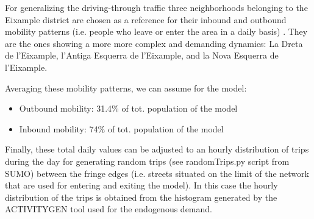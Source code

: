 \documentclass[11pt]{article}
\begin{document}
For generalizing the driving-through traffic three neighborhoods belonging to the Eixample district are chosen as a reference for their inbound and outbound mobility patterns (i.e. people who leave or enter the area in a daily basis) \citep{BestiarioProyectosS.L.2014}. They are the ones showing a more more complex and demanding dynamics: La Dreta de l'Eixample, l'Antiga Esquerra de l'Eixample, and la Nova Esquerra de l'Eixample.

\begin{table}[htbp]
\centering
\caption{Demographic and mobility data for reference neighborhoods.}
\label{tab:hoods-ref}
\end{table}

Averaging these mobility patterns, we can assume for the model:
\begin{itemize}
    \item Outbound mobility: 31.4\% of tot. population of the model
    \item Inbound mobility: 74\% of tot. population of the model
\end{itemize}

Finally, these total daily values can be adjusted to an hourly distribution of trips during the day for generating random trips (see randomTrips.py script from SUMO) between the fringe edges (i.e. streets situated on the limit of the network that are used for entering and exiting the model). In this case the hourly distribution of the trips is obtained from the histogram generated by the ACTIVITYGEN tool used for the endogenous demand. 
\end{document}
